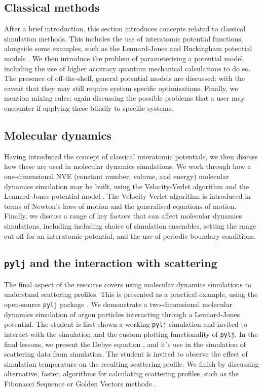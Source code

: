 \documentclass[amsmath,amssymb,twocolumn,superscriptaddress]{revtex4-1}
\begin{document}
\subsection{Classical methods}

After a brief introduction, this section introduces concepts related to classical simulation methods.
This includes the use of interatomic potential functions, alongside some examples, such as the Lennard-Jones and Buckingham potential models \cite{lennard-jones_determination_1924,buckingham_classical_1938}.
We then introduce the problem of parameterising a potential model, including the use of higher accuracy quantum mechanical calculations to do so.
The presence of off-the-shelf, general potential models are discussed; with the caveat that they may still require system specific optimisations.
Finally, we mention mixing rules; again discussing the possible problems that a user may encounter if applying these blindly to specific systems.

\subsection{Molecular dynamics}

Having introduced the concept of classical interatomic potentials, we then discuss how these are used in molecular dynamics simulations.
We work through how a one-dimensional NVE (constant number, volume, and energy) molecular dynamics simulation may be built, using the Velocity-Verlet algorithm and the Lennard-Jones potential model \cite{swope_computer_1982,lennard-jones_determination_1924}.
The Velocity-Verlet algorithm is introduced in terms of Newton's laws of motion and the generalised equations of motion.
Finally, we discuss a range of key factors that can affect molecular dynamics simulations, including including choice of simulation ensembles, setting the range cut-off for an interatomic potential, and the use of periodic boundary conditions.

\subsection{\texttt{pylj} and the interaction with scattering}

The final aspect of the resource covers using molecular dynamics simulations to understand scattering profiles.
This is presented as a practical example, using the open-source \texttt{pylj} package \cite{mccluskey_pylj_2018}.
We demonstrate a two-dimensional molecular dynamics simulation of argon particles interacting through a Lennard-Jones potential.
The student is first shown a working \texttt{pylj} simulation and invited to interact with the simulation and the custom plotting functionality of \texttt{pylj}.
In the final lessons, we present the Debye equation \cite{debye_zerstreuung_1915}, and it's use in the simulation of scattering data from simulation.
The student is invited to observe the effect of simulation temperature on the resulting scattering profile.
We finish by discussing alternative, faster, algorithms for calculating scattering profiles, such as the Fibonacci Sequence or Golden Vectors methods \cite{svergun_solution_1994,watson_rapid_2013}.
\end{document}
